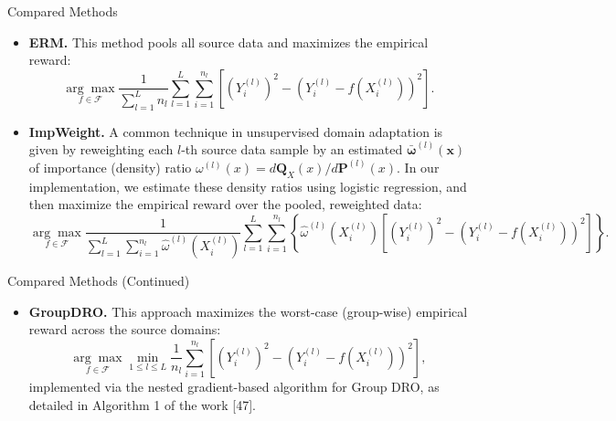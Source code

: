 \documentclass{beamer}
\begin{document}
\begin{frame}{Compared Methods}
    \begin{itemize}
        \item \textbf{ERM.} This method pools all source data and maximizes the empirical reward:
        \begin{equation*}
            \underset {f \in \mathcal{F}} {\arg \max} \frac {1}{\sum_{l = 1}^{L} n_{l}} \sum_{l = 1}^{L} \sum_{i = 1}^{n_{l}} \left[ (Y_{i}^{(l)})^{2} - (Y_{i}^{(l)} - f (X_{i}^{(l)}))^{2} \right].
        \end{equation*}
        \item \textbf{ImpWeight.} A common technique in unsupervised domain adaptation is given by reweighting each $l$-th source data sample by an estimated $\bar{\boldsymbol{\omega}}^{(l)}(\boldsymbol{x})$ of importance (density) ratio ${\omega^{(l)}}(x) = d\mathbf{Q}_{X}(x) / d\mathbf{P}^{(l)}(x)$. In our implementation, we estimate these density ratios using logistic regression, and then maximize the empirical reward over the pooled, reweighted data:
        \begin{equation*}
            \underset {f \in \mathcal{F}} {\arg \max} \frac {1}{\sum_{l = 1}^{L} \sum_{i = 1}^{n_{l}} \widehat{\omega}^{(l)} (X_{i}^{(l)})} \sum_{l = 1}^{L} \sum_{i = 1}^{n_{l}} \left\{\widehat{\omega}^{(l)} (X_{i}^{(l)}) \left[ (Y_{i}^{(l)})^{2} - (Y_{i}^{(l)} - f (X_{i}^{(l)}))^{2} \right] \right\}.
        \end{equation*}
    \end{itemize}
\end{frame}

\begin{frame}{Compared Methods (Continued)}
    \begin{itemize}
        \item \textbf{GroupDRO.} This approach maximizes the worst-case (group-wise) empirical reward across the source domains:
        \begin{equation*}
            \underset {f \in \mathcal{F}} {\arg \max} \underset {1 \leq l \leq L} {\min} \frac {1}{n_{l}} \sum_{i = 1}^{n_{l}} \left[ (Y_{i}^{(l)})^{2} - (Y_{i}^{(l)} - f (X_{i}^{(l)}))^{2} \right],
        \end{equation*}
        implemented via the nested gradient-based algorithm for Group DRO, as detailed in Algorithm 1 of the work [47].
    \end{itemize}
\end{frame}
\end{document}
